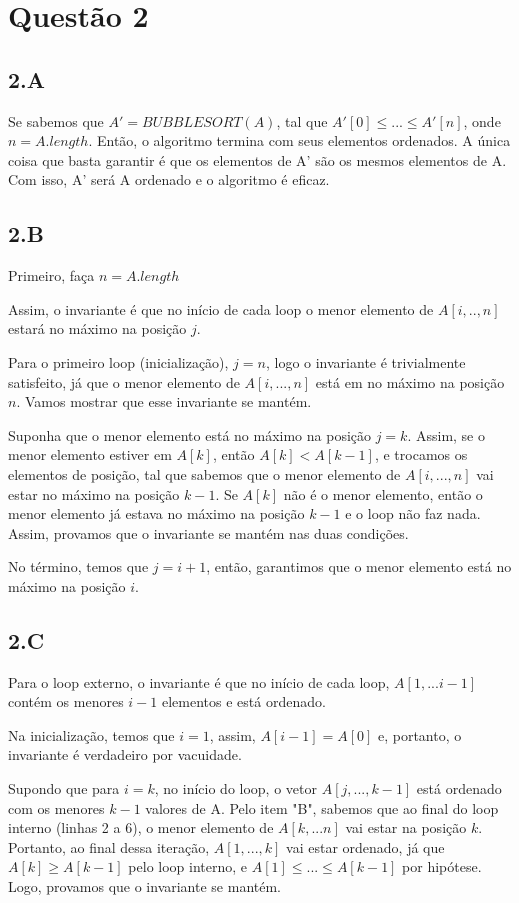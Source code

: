 \documentclass{article}
\begin{document}
\section*{Questão 2}
\subsection*{2.A}
Se sabemos que $A' = BUBBLESORT(A)$, tal que $A'[0]\leq...\leq A'[n]$, onde $n=A.length$. Então, o algoritmo
termina com seus elementos ordenados. A única coisa que basta garantir é que os elementos de A' são os 
mesmos elementos de A. Com isso, A' será A ordenado e o algoritmo é eficaz.
\subsection*{2.B}
Primeiro, faça $n = A.length$

Assim, o invariante é que no início de cada loop o menor elemento de $A[i,..,n]$ estará no
máximo na posição $j$.

Para o primeiro loop (inicialização), $j=n$, logo o invariante é trivialmente satisfeito, já que o menor
elemento de $A[i,...,n]$ está em no máximo na posição $n$. Vamos mostrar que esse invariante se mantém.

Suponha que o menor elemento está no máximo na posição $j=k$. Assim, se o menor elemento estiver em $A[k]$, então
$A[k]<A[k-1]$, e trocamos os elementos de posição, tal que sabemos que o menor elemento de $A[i,...,n]$ vai estar
no máximo na posição $k-1$. Se $A[k]$ não é o menor elemento, então o menor elemento já estava no máximo na posição
$k-1$ e o loop não faz nada. Assim, provamos que o invariante se mantém nas duas condições.

No término, temos que $j=i+1$, então, garantimos que o menor elemento está no máximo na posição $i$.
\subsection*{2.C}
Para o loop externo, o invariante é que no início de cada loop, $A[1,...i-1]$ contém os menores $i-1$ elementos
e está ordenado.

Na inicialização, temos que $i=1$, assim, $A[i-1]=A[0]$ e, portanto, o invariante é verdadeiro por vacuidade.

Supondo que para $i=k$, no início do loop, o vetor $A[j,...,k-1]$ está ordenado com os menores $k-1$ valores de A.
Pelo item "B", sabemos que ao final do loop interno (linhas 2 a 6), o menor elemento de $A[k,...n]$ vai estar na posição $k$.
Portanto, ao final dessa iteração, $A[1,...,k]$ vai estar ordenado, já que $A[k]\geq A[k-1]$ pelo loop interno, e 
$A[1]\leq...\leq A[k-1]$ por hipótese. Logo, provamos que o invariante se mantém.
\end{document}
